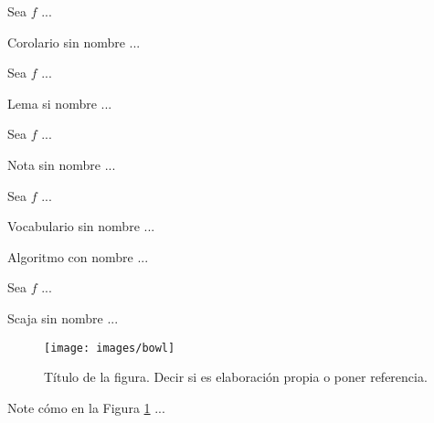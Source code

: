 \documentclass[fleqn]{Paquetes/RevDigMatEduInt}
\begin{document}
\begin{corolario}
	Sea $f$ ...
\end{corolario}

\begin{corolario}
Corolario sin nombre ...
\end{corolario}

\begin{lema}
Sea $f$ ...
\end{lema}

\begin{lema}
Lema si nombre ...
\end{lema}

\begin{nota}
Sea $f$ ...
\end{nota}

\begin{nota}
Nota sin nombre ...
\end{nota}

\begin{vocabulario}
Sea $f$ ...
\end{vocabulario}

\begin{vocabulario}
Vocabulario sin nombre ...
\end{vocabulario}

\begin{algoritmo}
	Algoritmo con nombre ...
\end{algoritmo}


\begin{caja}
Sea $f$ ...
\end{caja}

\begin{scaja}
Scaja sin nombre ...
\end{scaja}


\begin{figure}[ht!!!]
	\centering
	\begin{minipage}{0.7\textwidth}
		\centering
		\texttt{[image: images/bowl]}
		\caption{Título de la figura. Decir si es elaboración propia o poner referencia.}
		\label{fig:nombre}
	\end{minipage}
\end{figure}

Note cómo en la Figura \ref{fig:nombre} ...
\end{document}

